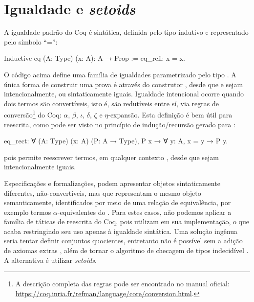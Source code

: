 \section{Igualdade e \textit{setoids}}\label{sec:igualdade}
A igualdade padrão do Coq é sintática, definida pelo tipo indutivo  e representado pelo símbolo ``='':
\begin{coqcode}
Inductive eq (A: Type) (x: A): A → Prop := eq_refl: x = x.	
\end{coqcode}
O código acima define uma família de igualdades parametrizado pelo tipo . A única forma de construir uma prova  é através do construtor , desde que  e  sejam intencionalmente, ou sintaticamente iguais. Igualdade intencional ocorre quando dois termos são convertíveis, isto é, são redutíveis entre sí, via regras de conversão\footnote{A descrição completa das regras pode ser encontrado no manual oficial: \url{https://coq.inria.fr/refman/language/core/conversion.html}.} do Coq: $\alpha$, $\beta$, $\iota$, $\delta$, $\zeta$ e $\eta$-expansão.  Esta definição é bem útil para reescrita, como pode ser visto no princípio de indução/recursão gerado para :
\begin{coqcode}
eq_rect: ∀ (A: Type) (x: A) (P: A → Type), P x → ∀ y: A, x = y → P y.
\end{coqcode}
pois permite reescrever termos, em qualquer contexto , desde que sejam intencionalmente iguais. 

Especificações e formalizações, podem apresentar objetos sintaticamente diferentes, não-convertíveis, mas que representam o mesmo objeto semanticamente, identificados por meio de uma relação de equivalência, por exemplo termos $\alpha$-equivalentes do \lcalc. Para estes casos, não podemos aplicar a família de táticas de reescrita do Coq, pois utilizam  em sua implementação, o que acaba restringindo seu uso apenas à igualdade sintática. Uma solução ingênua seria tentar definir conjuntos quocientes, entretanto não é possível sem a adição de axiomas extras \cite{Chicli2003}, além de tornar o algoritmo de checagem de tipos indecidível \cite{Geuvers2002}. A alternativa é utilizar \textit{setoids}.

